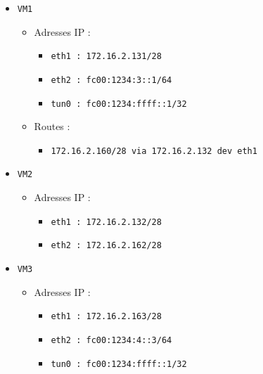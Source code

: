 \documentclass[a4paper, 10pt]{article}
\begin{document}
      \begin{itemize}
        \item \verb-VM1-
              \begin{itemize}
                \item Adresses IP :
                      \begin{itemize}
                        \item \verb+eth1 : 172.16.2.131/28+
                        \item \verb+eth2 : fc00:1234:3::1/64+
                        \item \verb+tun0 : fc00:1234:ffff::1/32+
                      \end{itemize}

                \item Routes :
                      \begin{itemize}
                        \item \verb+172.16.2.160/28 via 172.16.2.132 dev eth1+
                      \end{itemize}
              \end{itemize}

        \item \verb+VM2+
              \begin{itemize}
                \item Adresses IP :
                      \begin{itemize}
                        \item \verb+eth1 : 172.16.2.132/28+
                        \item \verb+eth2 : 172.16.2.162/28+
                      \end{itemize}
              \end{itemize}

        \item \verb+VM3+
              \begin{itemize}
                \item Adresses IP :
                      \begin{itemize}
                        \item \verb+eth1 : 172.16.2.163/28+
                        \item \verb+eth2 : fc00:1234:4::3/64+
                        \item \verb+tun0 : fc00:1234:ffff::1/32+
                      \end{itemize}


\end{itemize}
\end{itemize}
\end{document}
